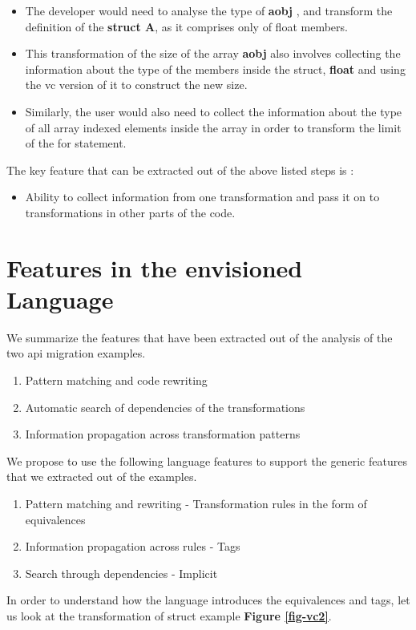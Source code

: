 \documentclass[preprint]{sigplanconf}
\begin{document}
\begin{itemize}

\item The developer would need to analyse the type of \textbf{aobj} , and transform the definition of the \textbf{struct A}, as it comprises only of float members.
\item This transformation of the size of the array \textbf{aobj} also involves collecting the information about the type of the members inside the struct, \textbf{float} and using the vc version of it to construct the new size. 
\item Similarly, the user would also need to collect the information about the type of all array indexed elements inside the array in order to transform the limit of the for statement. 

\end{itemize}
The key feature that can be extracted out of the above listed steps is :
\begin{itemize}
\item Ability to collect information from one transformation and pass it on to transformations in other parts of the code.
\end{itemize}

\section{Features in the envisioned Language}
We summarize the features that have been extracted out of the analysis of the two api migration examples.
\begin{enumerate}
\item Pattern matching and code rewriting
\item Automatic search of dependencies of the transformations
\item Information propagation across transformation patterns
\end{enumerate}
We propose to use the following language features to support the generic features that we extracted out of the examples.
\begin{enumerate}
\item Pattern matching and rewriting - Transformation rules in the form of equivalences
\item Information propagation across rules - Tags 
\item Search through dependencies - Implicit
\end{enumerate}

In order to understand how the language introduces the equivalences and tags, let us look at the transformation of struct example \textbf{Figure \ref{fig-vc2}}.
\end{document}
